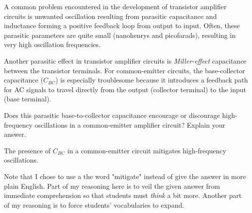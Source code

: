 

A common problem encountered in the development of transistor amplifier circuits is unwanted oscillation resulting from parasitic capacitance and inductance forming a positive feedback loop from output to input.  Often, these parasitic parameters are quite small (nanohenrys and picofarads), resulting in very high oscillation frequencies.

Another parasitic effect in transistor amplifier circuits is {\it Miller-effect} capacitance between the transistor terminals.  For common-emitter circuits, the base-collector capacitance ($C_{BC}$) is especially troublesome because it introduces a feedback path for AC signals to travel directly from the output (collector terminal) to the input (base terminal).

Does this parasitic base-to-collector capacitance encourage or discourage high-frequency oscillations in a common-emitter amplifier circuit?  Explain your answer.







The presence of $C_{BC}$ in a common-emitter circuit mitigates high-frequency oscillations.







Note that I chose to use a the word "mitigate" instead of give the answer in more plain English.  Part of my reasoning here is to veil the given answer from immediate comprehension so that students must {\it think} a bit more.  Another part of my reasoning is to force students' vocabularies to expand.




